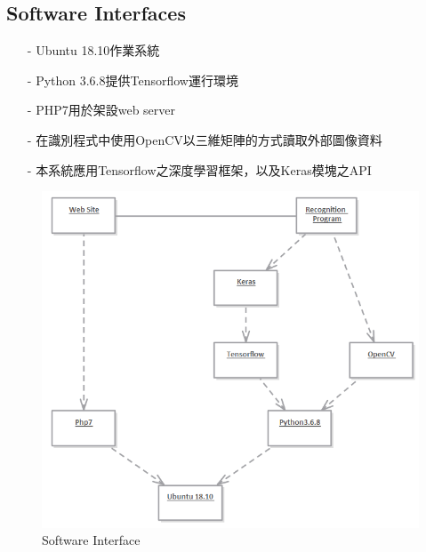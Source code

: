 \documentclass{scrreprt}
\begin{document}
\begin{CJK}{UTF8}{bkai}
\section{Software Interfaces}
\begin{itemize}
\item[-] Ubuntu 18.10作業系統
\item[-] Python 3.6.8提供Tensorflow運行環境
\item[-] PHP7用於架設web server
\item[-] 在識別程式中使用OpenCV以三維矩陣的方式讀取外部圖像資料
\item[-] 本系統應用Tensorflow之深度學習框架，以及Keras模塊之API
\end{itemize}

\begin{figure}[ht]
\begin{center}
\includegraphics[width=14cm]{interface.png}
\end{center}
\caption{Software Interface}
\label{fig:1}
\end{figure}


\end{CJK}
\end{document}

